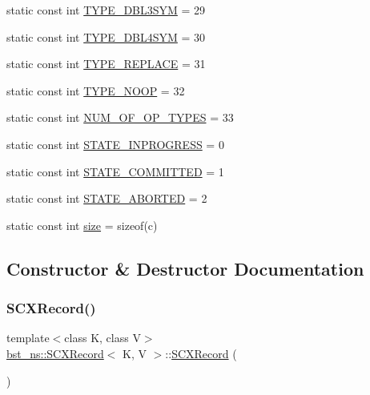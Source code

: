 \begin{DoxyCompactItemize}
\item 
static const int \hyperlink{classbst__ns_1_1SCXRecord_a4e876202e1b5929f982b946287be7690}{T\+Y\+P\+E\+\_\+\+D\+B\+L3\+S\+YM} = 29
\item 
static const int \hyperlink{classbst__ns_1_1SCXRecord_a6e62cd8c43c2dd8c583bf101094aed03}{T\+Y\+P\+E\+\_\+\+D\+B\+L4\+S\+YM} = 30
\item 
static const int \hyperlink{classbst__ns_1_1SCXRecord_a1c9436563626cacffd1fece60cfac30a}{T\+Y\+P\+E\+\_\+\+R\+E\+P\+L\+A\+CE} = 31
\item 
static const int \hyperlink{classbst__ns_1_1SCXRecord_a0e23ae4d646e889a457df7df143bc95a}{T\+Y\+P\+E\+\_\+\+N\+O\+OP} = 32
\item 
static const int \hyperlink{classbst__ns_1_1SCXRecord_a0122c12a08e3656845100691fa27d664}{N\+U\+M\+\_\+\+O\+F\+\_\+\+O\+P\+\_\+\+T\+Y\+P\+ES} = 33
\item 
static const int \hyperlink{classbst__ns_1_1SCXRecord_a9223099c087943bb82aa625e66068fa8}{S\+T\+A\+T\+E\+\_\+\+I\+N\+P\+R\+O\+G\+R\+E\+SS} = 0
\item 
static const int \hyperlink{classbst__ns_1_1SCXRecord_a2302bf603882e8a59aa206d18ad4541a}{S\+T\+A\+T\+E\+\_\+\+C\+O\+M\+M\+I\+T\+T\+ED} = 1
\item 
static const int \hyperlink{classbst__ns_1_1SCXRecord_a820a1803ba1c69acf94b32eb04a4d167}{S\+T\+A\+T\+E\+\_\+\+A\+B\+O\+R\+T\+ED} = 2
\item 
static const int \hyperlink{classbst__ns_1_1SCXRecord_a13d0068348b61415f312e0e648c7dd2b}{size} = sizeof(c)
\end{DoxyCompactItemize}


\subsection{Constructor \& Destructor Documentation}
\mbox{\label{classbst__ns_1_1SCXRecord_a49f921666ea148854d5b3c7fcb060d7a}} 
\subsubsection{\texorpdfstring{S\+C\+X\+Record()}{SCXRecord()}\hspace{0.1cm}{\footnotesize\ttfamily [1/2]}}
{\footnotesize\ttfamily template$<$class K, class V$>$ \\
\hyperlink{classbst__ns_1_1SCXRecord}{bst\+\_\+ns\+::\+S\+C\+X\+Record}$<$ K, V $>$\+::\hyperlink{classbst__ns_1_1SCXRecord}{S\+C\+X\+Record} (\begin{DoxyParamCaption}{ }\end{DoxyParamCaption})\hspace{0.3cm}{\ttfamily [inline]}}

